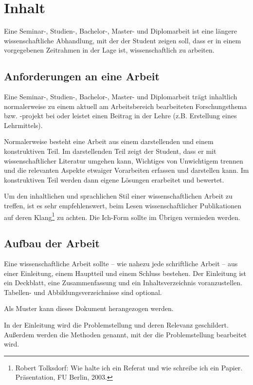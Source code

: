 \documentclass[12pt]{scrartcl}
\begin{document}
\section{Inhalt}

Eine Seminar-, Studien-, Bachelor-, Master- und Diplomarbeit ist eine längere wissenschaftliche Abhandlung, mit der der Student zeigen soll, dass er in einem vorgegebenen Zeitrahmen in der Lage ist, wissenschaftlich zu arbeiten. 

\subsection{Anforderungen an eine Arbeit}

Eine Seminar-, Studien-, Bachelor-, Master- und Diplomarbeit trägt inhaltlich normalerweise zu einem aktuell am Arbeitsbereich bearbeiteten Forschungsthema bzw. -projekt bei oder leistet einen Beitrag in der Lehre (z.B. Erstellung eines Lehrmittels).

Normalerweise besteht eine Arbeit aus einem darstellenden und einem konstruktiven Teil. Im darstellenden Teil zeigt der Student, dass er mit wissenschaftlicher Literatur umgehen kann, Wichtiges von Unwichtigem trennen und die relevanten Aspekte etwaiger Vorarbeiten erfassen und darstellen kann. Im konstruktiven Teil werden dann eigene Lösungen erarbeitet und bewertet.

Um den inhaltlichen und sprachlichen Stil einer wissenschaftlichen Arbeit zu treffen, ist es sehr empfehlenswert, beim Lesen wissenschaftlicher Publikationen auf deren \glqq Klang\grqq\/\footnote{Robert Tolksdorf: Wie halte ich ein Referat und wie schreibe ich ein Papier. Präsentation, FU Berlin, 2003.} zu achten. Die Ich-Form sollte im Übrigen vermieden werden.

\subsection{Aufbau der Arbeit}
 
Eine wissenschaftliche Arbeit sollte -- wie nahezu jede schriftliche Arbeit -- aus einer Einleitung, einem Hauptteil und einem Schluss bestehen. Der Einleitung ist ein Deckblatt, eine Zusammenfassung und ein Inhaltsverzeichnis voranzustellen. Tabellen- und Abbildungsverzeichnisse sind optional.

Als Muster kann dieses Dokument herangezogen werden.

In der Einleitung wird die Problemstellung und deren Relevanz geschildert. Außerdem werden die Methoden genannt, mit der die Problemstellung bearbeitet wird. 
\end{document}
